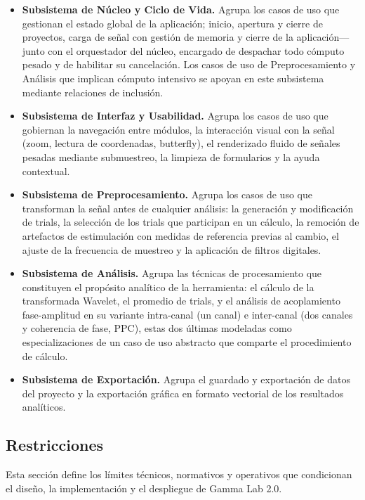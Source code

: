 \documentclass[12pt,letterpaper,oneside]{article}
\begin{document}
\begin{itemize}
    \item \textbf{Subsistema de Núcleo y Ciclo de Vida.} Agrupa los casos de uso que gestionan el estado global de la aplicación; inicio, apertura y cierre de proyectos, carga de señal con gestión de memoria y cierre de la aplicación— junto con el orquestador del núcleo, encargado de despachar todo cómputo pesado y de habilitar su cancelación. Los casos de uso de Preprocesamiento y Análisis que implican cómputo intensivo se apoyan en este subsistema mediante relaciones de inclusión.

    \item \textbf{Subsistema de Interfaz y Usabilidad.} Agrupa los casos de uso que gobiernan la navegación entre módulos, la interacción visual con la señal (zoom, lectura de coordenadas, butterfly), el renderizado fluido de señales pesadas mediante submuestreo, la limpieza de formularios y la ayuda contextual.

    \item \textbf{Subsistema de Preprocesamiento.} Agrupa los casos de uso que transforman la señal antes de cualquier análisis: la generación y modificación de trials, la selección de los trials que participan en un cálculo, la remoción de artefactos de estimulación con medidas de referencia previas al cambio, el ajuste de la frecuencia de muestreo y la aplicación de filtros digitales.

    \item \textbf{Subsistema de Análisis.} Agrupa las técnicas de procesamiento que constituyen el propósito analítico de la herramienta: el cálculo de la transformada Wavelet, el promedio de trials, y el análisis de acoplamiento fase-amplitud en su variante intra-canal (un canal) e inter-canal (dos canales y coherencia de fase, PPC), estas dos últimas modeladas como especializaciones de un caso de uso abstracto que comparte el procedimiento de cálculo.

    \item \textbf{Subsistema de Exportación.} Agrupa el guardado y exportación de datos del proyecto y la exportación gráfica en formato vectorial de los resultados analíticos.
\end{itemize}


\subsection{Restricciones}

Esta sección define los límites técnicos, normativos y operativos que condicionan el diseño, la implementación y el despliegue de Gamma Lab 2.0.
\end{document}
